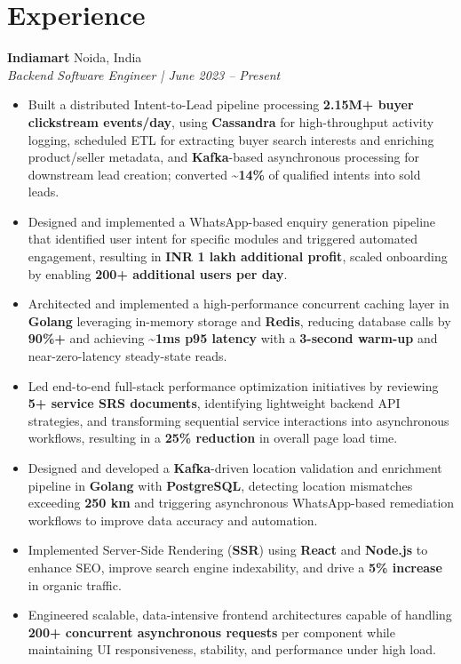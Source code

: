 \documentclass[8pt,a4paper]{extarticle}
\newcommand{\role}[2]{%
  \noindent\textbf{#1} \hfill #2\\[1pt]
}
\begin{document}
\section*{Experience}

\role{Indiamart}{Noida, India}
\textit{Backend Software Engineer | June 2023 -- Present}
\begin{itemize}
 \item Built a distributed Intent-to-Lead pipeline processing \textbf{2.15M+ buyer clickstream events/day}, using \textbf{Cassandra} for high-throughput activity logging, scheduled ETL for extracting buyer search interests and enriching product/seller metadata, and \textbf{Kafka}-based asynchronous processing for downstream lead creation; converted \textbf{\textasciitilde{}14\%} of qualified intents into sold leads.
\item Designed and implemented a WhatsApp-based enquiry generation pipeline that identified user intent for specific modules and triggered automated engagement, resulting in \textbf{INR 1 lakh additional profit}, scaled onboarding by enabling \textbf{200+ additional users per day}.
\item Architected and implemented a high-performance concurrent caching layer in \textbf{Golang} leveraging in-memory storage and \textbf{Redis}, reducing database calls by \textbf{90\%+} and achieving \textbf{\textasciitilde{}1ms p95 latency} with a \textbf{3-second warm-up} and near-zero-latency steady-state reads.
\item Led end-to-end full-stack performance optimization initiatives by reviewing \textbf{5+ service SRS documents}, identifying lightweight backend API strategies, and transforming sequential service interactions into asynchronous workflows, resulting in a \textbf{25\% reduction} in overall page load time.
\item Designed and developed a \textbf{Kafka}-driven location validation and enrichment pipeline in \textbf{Golang} with \textbf{PostgreSQL}, detecting location mismatches exceeding \textbf{250 km} and triggering asynchronous WhatsApp-based remediation workflows to improve data accuracy and automation.
\item Implemented Server-Side Rendering (\textbf{SSR}) using \textbf{React} and \textbf{Node.js} to enhance SEO, improve search engine indexability, and drive a \textbf{5\% increase} in organic traffic.
\item Engineered scalable, data-intensive frontend architectures capable of handling \textbf{200+ concurrent asynchronous requests} per component while maintaining UI responsiveness, stability, and performance under high load.

\end{itemize}
\end{document}
